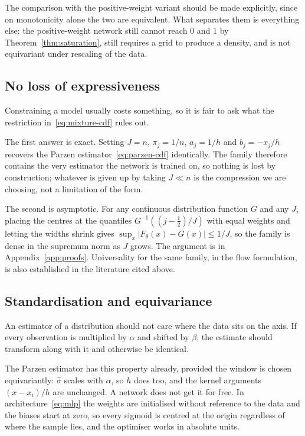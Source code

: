 \documentclass[11pt]{article}
\newcommand{\shat}{\hat{\sigma}}
\begin{document}
The comparison with the positive-weight variant should be made explicitly, since on
monotonicity alone the two are equivalent. What separates them is everything else: the
positive-weight network still cannot reach $0$ and $1$ by Theorem~\ref{thm:saturation}, still
requires a grid to produce a density, and is not equivariant under rescaling of the data.

\subsection{No loss of expressiveness}

Constraining a model usually costs something, so it is fair to ask what the restriction
in~\eqref{eq:mixture-cdf} rules out.

The first answer is exact. Setting $J = n$, $\pi_j = 1/n$, $a_j = 1/h$ and $b_j = -x_j/h$
recovers the Parzen estimator~\eqref{eq:parzen-cdf} identically. The family therefore
contains the very estimator the network is trained on, so nothing is lost by construction;
whatever is given up by taking $J \ll n$ is the compression we are choosing, not a limitation
of the form.

The second is asymptotic. For any continuous distribution function $G$ and any $J$, placing
the centres at the quantiles $G^{-1}((j - \tfrac12)/J)$ with equal weights and letting the
widths shrink gives $\sup_x |F_\theta(x) - G(x)| \le 1/J$, so the family is dense in the
supremum norm as $J$ grows. The argument is in Appendix~\ref{app:proofs}. Universality for
the same family, in the flow formulation, is also established in the literature cited above.

\subsection{Standardisation and equivariance}

An estimator of a distribution should not care where the data sits on the axis. If every
observation is multiplied by $\alpha$ and shifted by $\beta$, the estimate should transform
along with it and otherwise be identical.

The Parzen estimator has this property already, provided the window is chosen equivariantly:
$\shat$ scales with $\alpha$, so $h$ does too, and the kernel arguments $(x - x_i)/h$ are
unchanged. A network does not get it for free. In architecture~\eqref{eq:mlp} the weights are
initialised without reference to the data and the biases start at zero, so every sigmoid is
centred at the origin regardless of where the sample lies, and the optimiser works in absolute
units.
\end{document}
